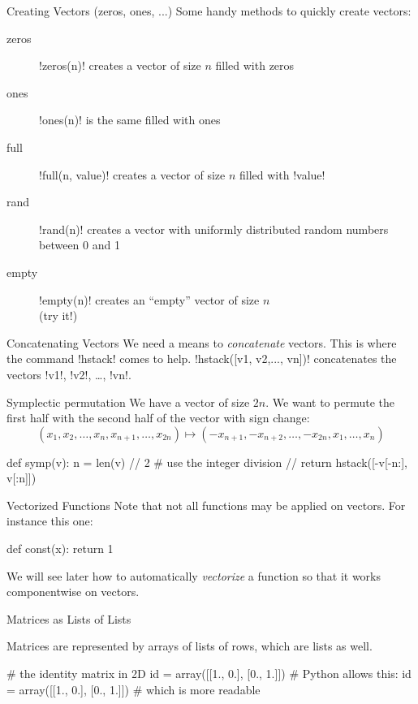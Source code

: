 \documentclass[hyperref={pdfpagelabels=false},table]{beamer}
\begin{document}
\begin{frame}[fragile]{Creating Vectors \hfill (zeros, ones, ...)}
Some handy methods to quickly create vectors:
\begin{description}
\item[zeros] \pyth!zeros(n)! creates a vector of size $n$ filled with zeros
\item[ones] \pyth!ones(n)! is the same filled with ones
\item[full] \pyth!full(n, value)! creates a vector of size $n$ filled with \pyth!value!
\item[rand] \pyth!rand(n)! creates a vector with {\tiny uniformly distributed} random numbers between 0 and 1
\item[empty] \pyth!empty(n)! creates an ``empty'' vector of size $n$ \\ \hfill (try it!)
\end{description}
\end{frame}

\begin{frame}[fragile]{Concatenating Vectors}
We need a means to \emph{concatenate} vectors. This is where the command \pyth!hstack! comes to help. \pyth!hstack([v1, v2,..., vn])! concatenates the vectors \pyth!v1!, \pyth!v2!, \ldots, \pyth!vn!.
\vfill
\begin{exampleblock}{Symplectic permutation}
We have a vector of size $2n$. We want to permute the first half with the second half of the vector with sign change:
\[(x_1, x_2,\ldots,x_n,x_{n+1},\ldots,x_{2n})\mapsto (-x_{n+1}, -x_{n+2},\ldots,-x_{2n},x_1,\ldots,x_n)\]
\begin{python}
def symp(v):
  n = len(v) // 2 # use the integer division //
  return hstack([-v[-n:], v[:n]])
\end{python}
\end{exampleblock}
\end{frame}

\begin{frame}[fragile]{Vectorized Functions}
Note that \alert{not all functions} may be applied on vectors. For instance this one:
\begin{python}
def const(x):
  return 1
\end{python}
We will see later how to automatically \emph{vectorize} a function so that it works componentwise on vectors.
\end{frame}


\begin{frame}[fragile]{Matrices as Lists of Lists}
\begin{defblock}
Matrices are represented by arrays of lists of \alert{rows}, which are lists as well.
\end{defblock}
\begin{python}
# the identity matrix in 2D
id = array([[1., 0.], [0., 1.]])
# Python allows this:
id = array([[1., 0.],
            [0., 1.]])
# which is more readable
\end{python}
\end{frame}
\end{document}
